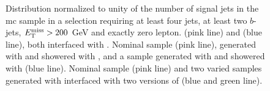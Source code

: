 \begin{figure}[htb]
\centering 
{}
\caption{Distribution normalized to unity of the number of signal jets in the \ttbar \gls{mc} sample in a selection requiring at least four jets, at least two $b$-jets, $E_{\rm T}^{\mathrm{miss}}>200$ GeV and exactly zero lepton. 
 \PowhegBox (pink line) and \aNLO (blue line), both interfaced with \HWpp.
 Nominal sample (pink line), generated with \PowhegBox and showered with \PY, and a sample generated with \PowhegBox and showered with \HWpp (blue line).
 Nominal sample (pink line) and two varied samples generated with \PowhegBox interfaced with two versions of \PY (blue and green line).
}\label{fig:ttbar_nj_0L_syst}
\end{figure}

